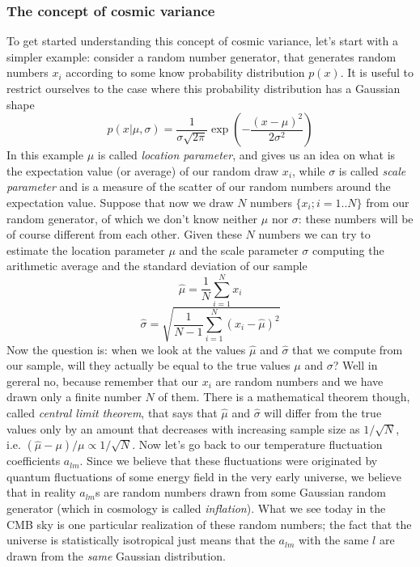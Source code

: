 \subsubsection{The concept of cosmic variance}
%
To get started understanding this concept of cosmic variance, let's start with a simpler example: consider a random number generator, that generates random numbers $x_i$ according to some know probability distribution $p(x)$. It is useful to restrict ourselves to the case where this probability distribution has a Gaussian shape
\begin{equation}
p(x\vert\mu,\sigma)=\frac{1}{\sigma\sqrt{2\pi}}\exp{\left(-\frac{(x-\mu)^2}{2\sigma^2}\right)}
\end{equation} 
%
In this example $\mu$ is called \textit{location parameter}, and gives us an idea on what is the expectation value (or average) of our random draw $x_i$, while $\sigma$ is called \textit{scale parameter} and is a measure of the scatter of our random numbers around the expectation value. Suppose that now we draw $N$ numbers $\{x_i;i=1..N\}$ from our random generator, of which we don't know neither $\mu$ nor $\sigma$: these numbers will be of course different from each other. Given these $N$ numbers we can try to estimate the location parameter $\mu$ and the scale parameter $\sigma$ computing the arithmetic average and the standard deviation of our sample
\begin{equation}
\hat{\mu}=\frac{1}{N}\sum_{i=1}^Nx_i
\end{equation}
\begin{equation}
\hat{\sigma}=\sqrt{\frac{1}{N-1}\sum_{i=1}^N(x_i-\hat{\mu})^2}
\end{equation}
%
Now the question is: when we look at the values $\hat{\mu}$ and $\hat{\sigma}$ that we compute from our sample, will they actually be equal to the true values $\mu$ and $\sigma$? Well in gereral no, because remember that our $x_i$ are random numbers and we have drawn only a finite number $N$ of them. There is a mathematical theorem though, called \textit{central limit theorem}, that says that $\hat{\mu}$ and $\hat{\sigma}$ will differ from the true values only by an amount that decreases with increasing sample size as $1/\sqrt{N}$, i.e. $(\hat{\mu}-\mu)/\mu\propto1/\sqrt{N}$. Now let's go back to our temperature fluctuation coefficients $a_{lm}$. 
Since we believe that these fluctuations were originated by quantum fluctuations of some energy field in the very early universe, we believe that in reality $a_{lm}$s are random numbers drawn from some Gaussian random generator (which in cosmology is called \textit{inflation}). What we see today in the CMB sky is one particular realization of these random numbers; the fact that the universe is statistically isotropical just means that the $a_{lm}$ with the same $l$ are drawn from the \textit{same} Gaussian distribution. 

